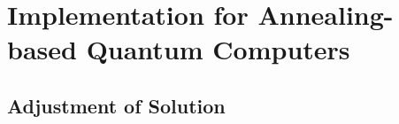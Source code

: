 \section{Implementation for Annealing-based Quantum Computers}


\subsection{Adjustment of Solution}
\label{approach:annealing.implementation.adjust}
